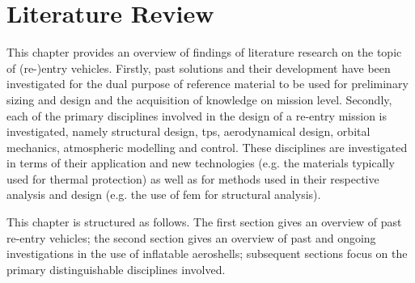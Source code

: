 \section{Literature Review}\label{cha:litreview}
This chapter provides an overview of findings of literature research on the topic of (re-)entry vehicles. Firstly, past solutions and their development have been investigated for the dual purpose of reference material to be used for preliminary sizing and design and the acquisition of knowledge on mission level. Secondly, each of the primary disciplines involved in the design of a re-entry mission is investigated, namely structural design, \gls{tps}, aerodynamical design, orbital mechanics, atmospheric modelling and control. These disciplines are investigated in terms of their application and new technologies (e.g. the materials typically used for thermal protection) as well as for methods used in their respective analysis and design (e.g. the use of \gls{fem} for structural analysis).

This chapter is structured as follows. The first section gives an overview of past re-entry vehicles; the second section gives an overview of past and ongoing investigations in the use of inflatable aeroshells; subsequent sections focus on the primary distinguishable disciplines involved.






